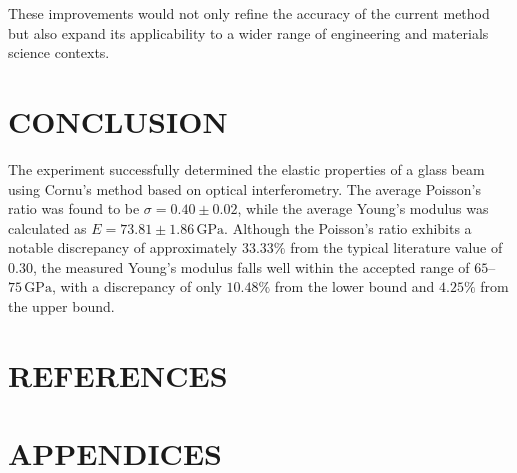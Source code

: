 \documentclass[a4paper,11pt]{article}
\begin{document}
These improvements would not only refine the accuracy of the current method but also expand its applicability to a wider range of engineering and materials science contexts.


\newpage
\section{\centering CONCLUSION}
\label{sec:CONCLUSION}
\indent 

The experiment successfully determined the elastic properties of a glass beam using Cornu's method based on optical interferometry. The average Poisson's ratio was found to be \(\sigma = 0.40 \pm 0.02\), while the average Young's modulus was calculated as \(E = 73.81 \pm 1.86\,\mathrm{GPa}\). Although the Poisson's ratio exhibits a notable discrepancy of approximately \(33.33\%\) from the typical literature value of \(0.30\), the measured Young's modulus falls well within the accepted range of \(65\)–\(75\,\mathrm{GPa}\), with a discrepancy of only \(10.48\%\) from the lower bound and \(4.25\%\) from the upper bound.\\

\newpage
\section{\centering REFERENCES}
\label{sec:REFERENCES}

\printbibliography[heading=none]

\newpage
\section{\centering APPENDICES}
\label{sec:APPENDICES}

\end{document}
